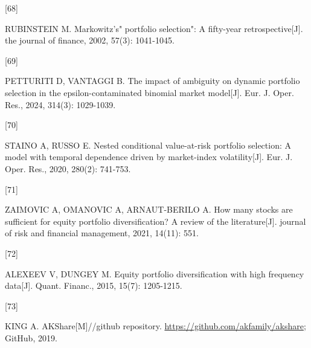 \documentclass[
  letterpaper,
  DIV=11,
  numbers=noendperiod]{scrartcl}
\newlength{\cslhangindent}
\newlength{\csllabelwidth}
\newenvironment{CSLReferences}[2] %
 {\begin{list}{}{%
  \setlength{\itemindent}{0pt}
  \setlength{\leftmargin}{0pt}
  \setlength{\parsep}{0pt}
  \ifodd #1
   \setlength{\leftmargin}{\cslhangindent}
   \setlength{\itemindent}{-1\cslhangindent}
  \fi
  \setlength{\itemsep}{#2\baselineskip}}}
 {\end{list}}
\newcommand{\CSLLeftMargin}[1]{\parbox[t]{\csllabelwidth}{\strut#1\strut}}
\newcommand{\CSLRightInline}[1]{\parbox[t]{\linewidth - \csllabelwidth}{\strut#1\strut}}
\begin{document}
\begin{CSLReferences}{0}{0}
\CSLLeftMargin{{[}68{]} }%
\CSLRightInline{RUBINSTEIN M. Markowitz's" portfolio selection": A
fifty-year retrospective{[}J{]}. the journal of finance, 2002, 57(3):
1041-1045.}

\CSLLeftMargin{{[}69{]} }%
\CSLRightInline{PETTURITI D, VANTAGGI B. The impact of ambiguity on
dynamic portfolio selection in the epsilon-contaminated binomial market
model{[}J{]}. Eur. J. Oper. Res., 2024, 314(3): 1029-1039.}

\CSLLeftMargin{{[}70{]} }%
\CSLRightInline{STAINO A, RUSSO E. Nested conditional value-at-risk
portfolio selection: A model with temporal dependence driven by
market-index volatility{[}J{]}. Eur. J. Oper. Res., 2020, 280(2):
741-753.}

\CSLLeftMargin{{[}71{]} }%
\CSLRightInline{ZAIMOVIC A, OMANOVIC A, ARNAUT-BERILO A. How many stocks
are sufficient for equity portfolio diversification? A review of the
literature{[}J{]}. journal of risk and financial management, 2021,
14(11): 551.}

\CSLLeftMargin{{[}72{]} }%
\CSLRightInline{ALEXEEV V, DUNGEY M. Equity portfolio diversification
with high frequency data{[}J{]}. Quant. Financ., 2015, 15(7):
1205-1215.}

\CSLLeftMargin{{[}73{]} }%
\CSLRightInline{KING A. AKShare{[}M{]}//github repository.
\url{https://github.com/akfamily/akshare}; GitHub, 2019.}

\end{CSLReferences}
\end{document}
